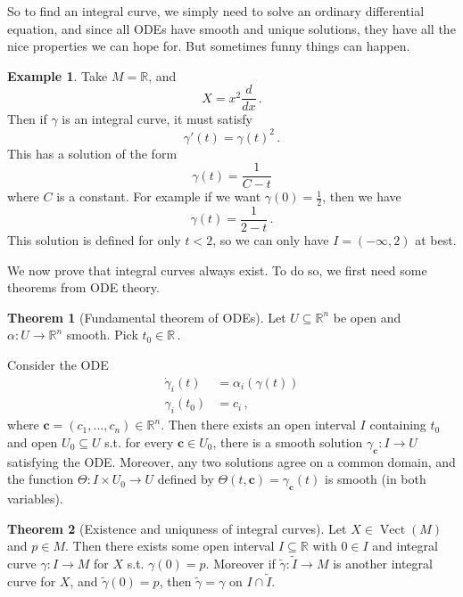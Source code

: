 \documentclass[a4paper,11pt]{article}
\theoremstyle{definition}
\newtheorem*{ex}{Example}
\newtheorem*{thm}{Theorem}
\DeclareMathOperator{\Vect}{Vect}
\numberwithin{equation}{section}
\begin{document}
So to find an integral curve, we simply need to solve an ordinary differential equation, and since all ODEs have smooth and unique solutions, they have all the nice properties we can hope for. But sometimes funny things can happen.

\begin{ex}
Take $M=\mathbb{R}$, and 
\[
X=x^2\frac{d}{dx}\,.
\]
Then if $\gamma$ is an integral curve, it must satisfy
\[
\gamma'(t)=\gamma(t)^2\,.
\]
This has a solution of the form
\[
\gamma(t)=\frac{1}{C-t}
\]
where $C$ is a constant. For example if we want $\gamma(0)=\frac{1}{2}$, then we have
\[
\gamma(t)=\frac{1}{2-t}\,.
\]
This solution is defined for only $t<2$, so we can only have $I=(-\infty,2)$ at best.
\end{ex}

We now prove that integral curves always exist. To do so, we first need some theorems from ODE theory.

\begin{thm}[Fundamental theorem of ODEs]
Let $U\subseteq\mathbb{R}^n$ be open and $\alpha:U\rightarrow\mathbb{R}^n$ smooth. Pick $t_0\in\mathbb{R}$\,.

Consider the ODE
\begin{align*}
    \dot{\gamma}_i(t)&=\alpha_i(\gamma(t))\\
    \gamma_i(t_0)&=c_i\,,
\end{align*}
where $\mathbf{c}=(c_1,...,c_n)\in\mathbb{R}^n$. Then there exists an open interval $I$ containing $t_0$ and open $U_0\subseteq U$ s.t. for every $\mathbf{c}\in U_0$, there is a smooth solution $\gamma_\mathbf{c}:I\rightarrow U$ satisfying the ODE. Moreover, any two solutions agree on a common domain, and the function $\Theta:I\times U_0\rightarrow U$ defined by $\Theta(t,\mathbf{c})=\gamma_\mathbf{c}(t)$ is smooth (in both variables).
\end{thm}

\begin{thm}[Existence and uniquness of integral curves]
Let $X\in\Vect(M)$ and $p\in M$. Then there exists some open interval $I\subseteq\mathbb{R}$ with $0\in I$ and integral curve $\gamma:I\rightarrow M$ for $X$ s.t. $\gamma(0)=p$. Moreover if $\tilde{\gamma}:\tilde{I}\rightarrow M$ is another integral curve for $X$, and $\tilde{\gamma}(0)=p$, then $\tilde{\gamma}=\gamma$ on $I\cap\tilde{I}$.
\end{thm}
\end{document}
